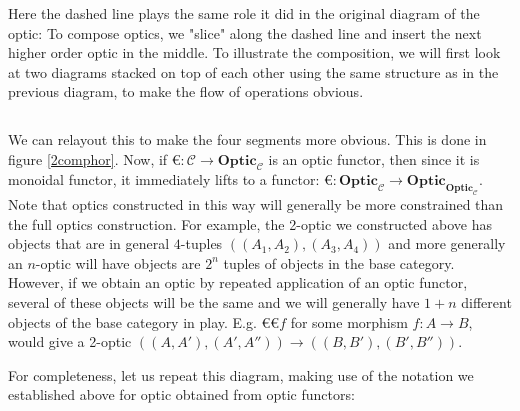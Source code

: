 \documentclass[letterpaper, 10 pt, conference]{ieeeconf}  %
\newcommand{\Optic}{\textbf{Optic}}
\begin{document}
Here the dashed line plays the same role it did in the original diagram of
the optic: To compose optics, we "slice" along the dashed line and insert
the next higher order optic in the middle. To illustrate the composition,
we will first look at two diagrams stacked on top of each other using the
same structure as in the previous diagram, to make the flow of operations
obvious.

\begin{equation}

\end{equation}

We can relayout this to make the four segments more obvious. This is done in
figure \ref{2comphor}. Now, if $\euro{}: \mathcal{C} \to \Optic_\mathcal{C}$ is an
optic functor, then since it is monoidal functor, it immediately lifts to a functor:
$\euro: \Optic_{\mathcal{C}} \to \Optic_{\Optic_\mathcal{C}}$. Note that optics
constructed in this way will generally be more constrained than the full optics
construction. For example, the 2-optic we constructed above has objects that
are in general $4$-tuples $((A_1, A_2), (A_3, A_4))$ and more generally an $n$-optic
will have objects are $2^n$ tuples of objects in the base category. However,
if we obtain an optic by repeated application of an optic functor, several
of these objects will be the same and we will generally have $1+n$ different
objects of the base category in play. E.g. $\euro \euro f$ for some
morphism $f: A\to B$, would give a 2-optic $((A, A'),(A', A'')) \to ((B,B'),(B',B''))$.

For completeness, let us repeat this diagram, making use of the notation we established
above for optic obtained from optic functors:
\end{document}
